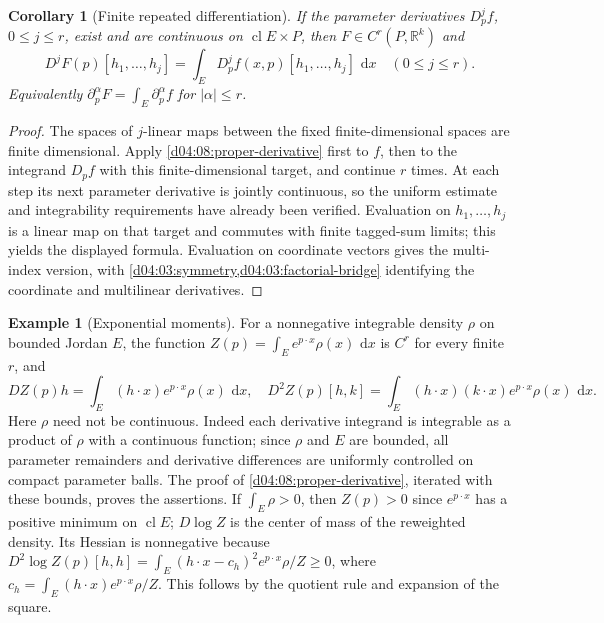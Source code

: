\documentclass[11pt,oneside,openany]{book}
\newtheorem{corollary}[theorem]{Corollary}
\theoremstyle{definition}
\newtheorem{example}[theorem]{Example}
\theoremstyle{remark}
\newcommand{\R}{\mathbb R}
\newcommand{\dd}{\,\mathrm d}
\DeclareMathOperator{\cl}{cl}
\newcommand{\family}[1]{}
\begin{document}
\family{K04.08.04}
\begin{corollary}[Finite repeated differentiation]\label{d04:08:repeated}
If the parameter derivatives $D_p^j f$, $0\leq j\leq r$, exist and are continuous on $\cl E\times P$, then $F\in C^r(P,\R^k)$ and
\[
 D^jF(p)[h_1,\ldots,h_j]
 =\int_E D_p^jf(x,p)[h_1,\ldots,h_j]\,\dd x\quad(0\leq j\leq r).
\]
Equivalently $\partial_p^\alpha F=\int_E\partial_p^\alpha f$ for $|\alpha|\leq r$.
\end{corollary}
\begin{proof}
The spaces of $j$-linear maps between the fixed finite-dimensional spaces are finite dimensional. Apply \cref{d04:08:proper-derivative} first to $f$, then to the integrand $D_pf$ with this finite-dimensional target, and continue $r$ times. At each step its next parameter derivative is jointly continuous, so the uniform estimate and integrability requirements have already been verified. Evaluation on $h_1,\ldots,h_j$ is a linear map on that target and commutes with finite tagged-sum limits; this yields the displayed formula. Evaluation on coordinate vectors gives the multi-index version, with \cref{d04:03:symmetry,d04:03:factorial-bridge} identifying the coordinate and multilinear derivatives.
\end{proof}

\begin{example}[Exponential moments]\label{d04:08:exponential-moments}
For a nonnegative integrable density $\rho$ on bounded Jordan $E$, the function $Z(p)=\int_E e^{p\cdot x}\rho(x)\,\dd x$ is $C^r$ for every finite $r$, and
\[
 DZ(p)h=\int_E(h\cdot x)e^{p\cdot x}\rho(x)\,\dd x,
 \quad D^2Z(p)[h,k]=\int_E(h\cdot x)(k\cdot x)e^{p\cdot x}\rho(x)\,\dd x.
\]
Here $\rho$ need not be continuous. Indeed each derivative integrand is integrable as a product of $\rho$ with a continuous function; since $\rho$ and $E$ are bounded, all parameter remainders and derivative differences are uniformly controlled on compact parameter balls. The proof of \cref{d04:08:proper-derivative}, iterated with these bounds, proves the assertions. If $\int_E\rho>0$, then $Z(p)>0$ since $e^{p\cdot x}$ has a positive minimum on $\cl E$; $D\log Z$ is the center of mass of the reweighted density. Its Hessian is nonnegative because
$D^2\log Z(p)[h,h]=\int_E(h\cdot x-c_h)^2e^{p\cdot x}\rho/Z\geq0$, where $c_h=\int_E(h\cdot x)e^{p\cdot x}\rho/Z$. This follows by the quotient rule and expansion of the square.
\end{example}
\end{document}
